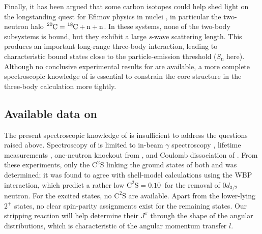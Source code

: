 \documentclass[a4paper, 10pt]{article}
\newcommand{\iso}[2]{\ce{^{#1}#2}}
\newcommand{\sn}{\ensuremath{S_{\text{n}}}\xspace}
\newcommand{\stwon}{\ensuremath{S_{\text{2n}}}\xspace}
\newcommand{\ctwos}{\ensuremath{\text{C}^2\text{S}}\xspace}
\begin{document}

Finally, it has been argued that some carbon isotopes could help shed light on the longstanding quest for Efimov physics in nuclei \cite{amorim1997,endo2025},
in particular the two-neutron halo $\iso{20}{C} = \iso{18}{C} + \iso{}{n} + \iso{}{n}$. In these systems, none of the two-body subsystems is bound, but they exhibit a large \textit{s}-wave scattering length. This produces an important long-range three-body interaction, leading to characteristic bound states close to the particle-emission threshold (\sn here). Although no conclusive experimental results for \iso{20}{C} are available, a more complete spectroscopic knowledge of \iso{18}{C} is essential to constrain the core structure in the three-body calculation more tightly.

\subsection{Available data on \texorpdfstring{\iso{18}{C}}{18C}}
The present spectroscopic knowledge of \iso{18}{C} is insufficient to address the questions raised above. Spectroscopy of \iso{18}{C} is limited to in-beam $\gamma$ spectroscopy \cite{stanoiu2008}, lifetime measurements \cite{ong2008,voss2012}, one-neutron knockout from \iso{19}{C} \cite{kondo2009}, and Coulomb dissociation of \iso{18,19}{C} \cite{heine2017}. From these experiments, only the \ctwos linking the ground states of both \iso{17}{C} and \iso{18}{C} was determined; it was found to agree with shell-model calculations using the WBP interaction, which predict a rather low $\ctwos = \qty{0.10}{}$ for the removal of $0d_{3/2}$ neutron. For the excited states, no \ctwos are available. Apart from the lower-lying $2^+$ states, no clear spin-parity assignments exist for the remaining states. Our stripping reaction will help determine their $J^\pi$ through the shape of the angular distributions, which is characteristic of the angular momentum transfer $l$.
\end{document}
